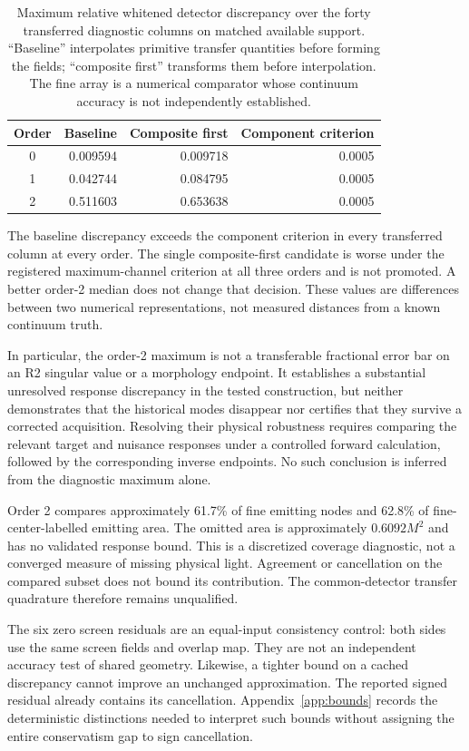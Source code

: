 \begin{table}[htbp]
\centering\small
\caption{Maximum relative whitened detector discrepancy over the forty transferred diagnostic columns on matched available support. ``Baseline'' interpolates primitive transfer quantities before forming the fields; ``composite first'' transforms them before interpolation. The fine array is a numerical comparator whose continuum accuracy is not independently established.}
\label{tab:audit}
\begin{tabular}{c r r r}
\toprule
Order&Baseline&Composite first&Component criterion\\
\midrule
0&0.009594&0.009718&0.0005\\
1&0.042744&0.084795&0.0005\\
2&0.511603&0.653638&0.0005\\
\bottomrule
\end{tabular}
\end{table}

The baseline discrepancy exceeds the component criterion in every transferred column at every order. The single composite-first candidate is worse under the registered maximum-channel criterion at all three orders and is not promoted. A better order-2 median does not change that decision. These values are differences between two numerical representations, not measured distances from a known continuum truth.

In particular, the order-2 maximum is not a transferable fractional error bar on an R2 singular value or a morphology endpoint. It establishes a substantial unresolved response discrepancy in the tested construction, but neither demonstrates that the historical modes disappear nor certifies that they survive a corrected acquisition. Resolving their physical robustness requires comparing the relevant target and nuisance responses under a controlled forward calculation, followed by the corresponding inverse endpoints. No such conclusion is inferred from the diagnostic maximum alone.

Order 2 compares approximately 61.7\% of fine emitting nodes and 62.8\% of fine-center-labelled emitting area. The omitted area is approximately $0.6092M^2$ and has no validated response bound. This is a discretized coverage diagnostic, not a converged measure of missing physical light. Agreement or cancellation on the compared subset does not bound its contribution. The common-detector transfer quadrature therefore remains unqualified.

The six zero screen residuals are an equal-input consistency control: both sides use the same screen fields and overlap map. They are not an independent accuracy test of shared geometry. Likewise, a tighter bound on a cached discrepancy cannot improve an unchanged approximation. The reported signed residual already contains its cancellation. Appendix~\ref{app:bounds} records the deterministic distinctions needed to interpret such bounds without assigning the entire conservatism gap to sign cancellation.

